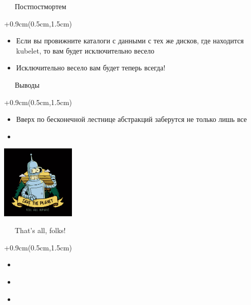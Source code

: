 \documentclass[xetex,18pt,aspectratio=43]{beamer}
\begin{document}
\begin{Large}
\begin{frame}{\ \ \ Постпостмортем}
\begin{textblock*}{\framewidth+0.9cm}(0.5cm,1.5cm)
\begin{itemize}
  \item Если вы провижните каталоги с данными с тех же дисков, где находится
    kubelet, то вам будет исключительно весело
  \item Исключительно весело вам будет теперь всегда!
\end{itemize}
\end{textblock*}
\end{frame}

\begin{frame}{\ \ \ Выводы}
\begin{textblock*}{\framewidth+0.9cm}(0.5cm,1.5cm)
\begin{itemize}
  \item Вверх по бесконечной лестнице абстракций заберутся не только лишь все
  \item
    \href{https://www.nytimes.com/2019/11/26/health/life-expectancy-rate-usa.html}{\color{linkcolor}{A new study shows that death rates increased for middle-aged people of all racial and ethnic groups}}
\end{itemize}
\begin{minipage}{\textwidth}
  \centering
  \includegraphics[height=3.5cm]{img/save}
\end{minipage}
\end{textblock*}
\end{frame}

\begin{frame}{\ \ \ That's all, folks!}
\begin{textblock*}{\framewidth+0.9cm}(0.5cm,1.5cm)
\begin{itemize}
  \item \href{mailto:alexclear@gmail.com}{\color{linkcolor}{alexclear@gmail.com}}
  \item \href{https://telegram.me/lhommequipleure}{\color{linkcolor}{https://telegram.me/lhommequipleure}}
  \item \href{https://telegram.me/demeliorator\_pod}{\color{linkcolor}{https://telegram.me/demeliorator\_pod}}
\end{itemize}
\end{textblock*}
\end{frame}

\end{Large}
\end{document}
